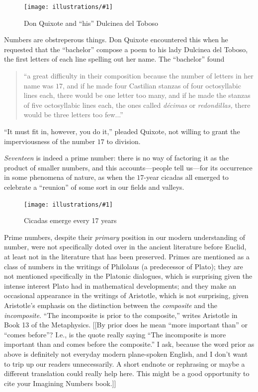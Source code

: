 \documentclass[11pt]{article}
\newcommand{\ill}[3]{ 
   \begin{figure}[htbp]
   \begin{center}
   \texttt{[image: illustrations/\#1]}
   \caption{#3}
   \end{center}
    \end{figure}
}
\theoremstyle{plain}
\theoremstyle{definition}
\numberwithin{equation}{section}
\numberwithin{figure}{section}
\numberwithin{table}{section}
\begin{document}
\ill{dulcinea1.jpg}{.2}{Don Quixote and ``his'' Dulcinea del Toboso}

Numbers are obstreperous things. Don Quixote encountered this when he
requested that the ``bachelor'' compose a poem to his lady Dulcinea del
Toboso, the first letters of each line spelling out her name. The
``bachelor'' found

\bigskip


\begin{quote}
  ``a great difficulty in their composition because the number of
  letters in her name was $17$, and if he made four Castilian stanzas
  of four octosyllabic lines each, there would be one letter too many,
  and if he made the stanzas of five octosyllabic lines each, the ones
  called {\em d{\'e}cimas} or {\em redondillas,} there would be three
  letters too few...''
\end{quote}
  
``It must fit in, however, you do it,'' pleaded Quixote, not willing to
grant the imperviousness of the number $17$ to division.


\bigskip


{\em Seventeen} is indeed a prime number: there is no way of factoring
it as the product of smaller numbers, and this accounts---people tell
us---for its occurrence in some phenomena of nature, as when
the $17$-year cicadas all emerged to celebrate a ``reunion'' of some
sort in our fields and valleys.

\ill{cicada}{.3}{Cicadas emerge every 17 years}

\bigskip


Prime numbers, despite their {\em primary} position in our modern
understanding of number, were not specifically doted over in the
ancient literature before Euclid, at least not in the literature that
has been preserved. Primes are mentioned as a class of numbers in the
writings of Philolaus (a predecessor of Plato); they are not mentioned
specifically in the Platonic dialogues, which is surprising 
given the intense interest Plato had in mathematical developments; and
they make an occasional appearance in the writings of Aristotle, which
is not surprising, given Aristotle's emphasis on the distinction
between the {\em composite} and the {\em incomposite}. ``The
incomposite is prior to the composite,'' writes Aristotle in Book 13 of
the Metaphysics.
[[By prior does he mean ``more important than'' or ``comes before''?  I.e., is the quote
really saying ``The incomposite is more important than and comes before the composite.''
I ask, because the word prior as above is definitely not everyday modern
plane-spoken English, and I don't want to trip up our readers unnecessarily.  A
short endnote or rephrasing or maybe a different translation could really help here.
This might be a good opportunity to cite your Imagining Numbers book.]]
           
\end{document}
